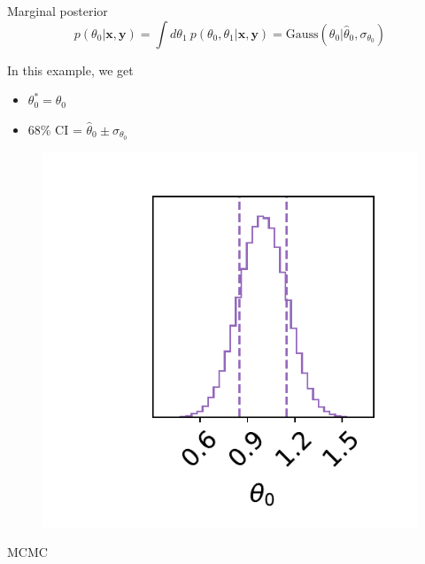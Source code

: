 \documentclass[
aspectratio=169,
14pt,
professionalfonts
]{beamer}
\begin{document}
\begin{frame}{Marginal posterior}
\vspace{-1cm}
    $$p(\theta_0|\mathbf{x}, \mathbf{y}) = \int d\theta_1 ~ p(\theta_0, \theta_1|\mathbf{x}, \mathbf{y}) = \text{Gauss}(\theta_0 | \hat \theta_0, \sigma_{\theta_0})$$
    \begin{minipage}{0.49\linewidth}
    In this example, we get
        \begin{itemize}
            \item $\theta_0^* = \hat \theta_0$
            \item 68\% CI = $\hat \theta_0 \pm \sigma_{\theta_0}$
        \end{itemize}
    \end{minipage}
    \begin{minipage}{0.49\linewidth}
    \begin{figure}
        \centering
        \includegraphics[width=0.9\linewidth]{../plots/marginal_posterior.pdf}
    \end{figure}
    \end{minipage}
\end{frame}

\begin{frame}
\center
\Large
MCMC
\end{frame}
\end{document}
